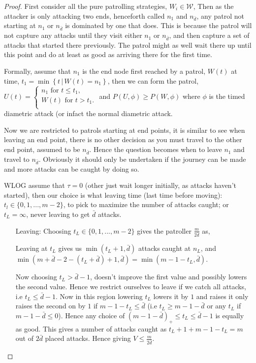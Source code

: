\documentclass[a4paper,10pt]{article}
\newcommand{\pospart}[1]{\left( #1 \right)_{+}}
\newcommand{\set}[2]{\left\{ #1 \, | \, #2 \right\}}
\theoremstyle{definition}
\theoremstyle{definition}
\theoremstyle{remark}
\theoremstyle{definition}
\begin{document}
\begin{proof}
First consider all the pure patrolling strategies, $W_{i} \in \mathcal{W}$, Then as the attacker is only attacking two ends, henceforth called $n_{1}$ and $n_{\bar{d}}$, any patrol not starting at $n_{1}$ or $n_{\bar{d}}$ is dominated by one that does.
This is because the patrol will not capture any attacks until they visit either $n_{1}$ or $n_{\bar{d}}$, and then capture a set of attacks that started there previously. The patrol might as well wait there up until this point and do at least as good as arriving there for the first time.

Formally, assume that $n_{1}$ is the end node first reached by a patrol, $W(t)$ at time, $t_{1}=\min \set{t}{W(t)=n_{1}}$, then we can form the patrol, $U(t)= \left\{ \begin{array}{l}
n_{1} \text{ for } t \leq t_{1}, \\
W(t) \text{ for } t>t_{1}. \\
\end{array} \right.$
and $P(U,\phi) \geq P(W,\phi)$ where $\phi$ is the timed diametric attack (or infact the normal diametric attack.

Now we are restricted to patrols starting at end points, it is similar to see when leaving an end point, there is no other decision as you must travel to the other end point, assumed to be $n_{\bar{d}}$. Hence the question becomes when to leave $n_{1}$ and travel to $n_{\bar{d}}$. Obviously it should only be undertaken if the journey can be made and more attacks can be caught by doing so.

WLOG assume that $\tau=0$ (other just wait longer initially, as attacks haven't started), then our choice is what leaving time (last time before moving): $t_{l} \in \{0,1,...,m-2 \}$, to pick to maximize the number of attacks caught; or $t_{L}=\infty$, never leaving to get $\bar{d}$ attacks.

\begin{itemize}
\item[Leaving:]Choosing $t_{L} \in \{0,1,...,m-2 \}$ gives the patroller $\frac{m}{2\bar{d}}$ as,

Leaving at $t_{L}$ gives us $\min(t_{L}+1,\bar{d})$ attacks caught at $n_{L}$, and $\min(m+\bar{d}-2-(t_{L}+\bar{d})+1,\bar{d})=\min(m-1-t_{L},\bar{d})$.

Now choosing $t_{L} > \bar{d}-1$, doesn't improve the first value and possibly lowers the second value. Hence we restrict ourselves to leave if we catch all attacks, i.e $t_{L} \leq \bar{d}-1$. Now in this region lowering $t_{L}$ lowers it by $1$ and raises it only raises the second on by $1$ if $m-1-t_{L} \leq \bar{d}$ (i.e $t_{L} \geq m-1-\bar{d}$ or any $t_{L}$ if $m-1-\bar{d} \leq 0$). Hence any choice of $\pospart{m-1-\bar{d}} \leq t_{L} \leq \bar{d}-1$ is equally as good. This gives a number of attacks caught as $t_{L}+1+m-1-t_{L}=m$ out of $2\bar{d}$ placed attacks. Hence giving $V \leq \frac{m}{2\bar{d}}$.


\end{itemize}
\end{proof}
\end{document}

